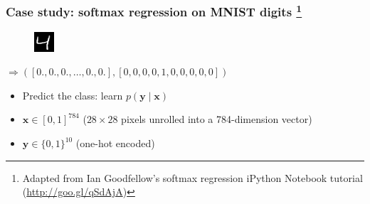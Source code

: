 \documentclass[mathserif, xcolor=dvipsnames]{beamer}
\begin{document}
\begin{frame}[t]
    \frametitle{Case study: softmax regression on MNIST digits
                \footnote{Adapted from Ian Goodfellow's softmax regression
                          iPython Notebook tutorial (\url{http://goo.gl/qSdAjA})}}

    \begin{center}
    \begin{minipage}{0.05\textwidth}
    \begin{figure}[H]
        \raggedleft
        \includegraphics[width=\textwidth]{mnist_4.png}
    \end{figure}
    \end{minipage}
    \begin{minipage}{0.9\textwidth}
        \raggedright
        $\Rightarrow ([0., 0., 0., \ldots, 0., 0.],
                      [0, 0, 0, 0, 1, 0, 0, 0, 0, 0])$
    \end{minipage}
    \end{center}

    \begin{itemize}\addtolength{\itemsep}{2.0\baselineskip}
        \item{Predict the class: learn $p(\mathbf{y} \mid \mathbf{x})$}
        \item{$\mathbf{x} \in [0, 1]^{784}$ ($28 \times 28$ pixels unrolled
              into a 784-dimension vector)}
        \item{$\mathbf{y} \in \{0, 1\}^{10}$ (one-hot encoded)}
    \end{itemize}
\end{frame}
\end{document}
